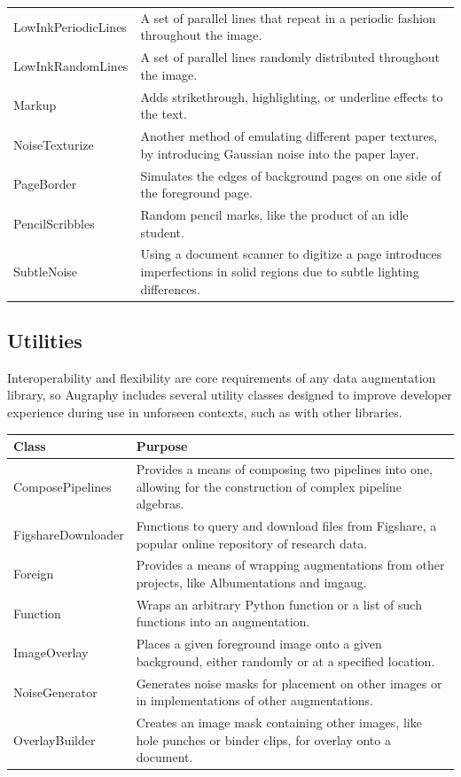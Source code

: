 \documentclass[runningheads]{article}
\begin{document}
\begin{center}
\begin{tabular}{ll}
LowInkPeriodicLines & A set of parallel lines that repeat in a periodic fashion throughout the image.\\
LowInkRandomLines & A set of parallel lines randomly distributed throughout the image.\\
Markup & Adds strikethrough, highlighting, or underline effects to the text.\\
NoiseTexturize & Another method of emulating different paper textures, by introducing Gaussian noise into the paper layer.\\
PageBorder & Simulates the edges of background pages on one side of the foreground page.\\
PencilScribbles & Random pencil marks, like the product of an idle student.\\
SubtleNoise & Using a document scanner to digitize a page introduces imperfections in solid regions due to subtle lighting differences.\\
\end{tabular}
\end{center}

\subsection{Utilities}
\label{sec:org8b47a22}
Interoperability and flexibility are core requirements of any data augmentation library, so Augraphy includes several utility classes designed to improve developer experience during use in unforseen contexts, such as with other libraries.

\begin{center}
\begin{tabular}{ll}
Class & Purpose\\
\hline
ComposePipelines & Provides a means of composing two pipelines into one, allowing for the construction of complex pipeline algebras.\\
FigshareDownloader & Functions to query and download files from Figshare, a popular online repository of research data.\\
Foreign & Provides a means of wrapping augmentations from other projects, like Albumentations and imgaug.\\
Function & Wraps an arbitrary Python function or a list of such functions into an augmentation.\\
ImageOverlay & Places a given foreground image onto a given background, either randomly or at a specified location.\\
NoiseGenerator & Generates noise masks for placement on other images or in implementations of other augmentations.\\
OverlayBuilder & Creates an image mask containing other images, like hole punches or binder clips, for overlay onto a document.\\
\end{tabular}
\end{center}
\end{document}

